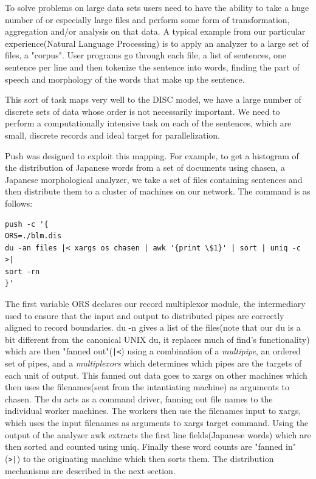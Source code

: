 \documentclass[10pt,conference,letterpaper]{IEEEtran}
\begin{document}
To solve problems on large data sets users need to have the ability to take a huge number of or especially large files and  perform some form of transformation, aggregation and/or analysis on that data.  A typical example from our particular experience(Natural Language Processing) is to apply an analyzer to a large set of files, a "corpus". User programs go through each file, a list of sentences, one sentence per line and then tokenize the sentence into words, finding the part of speech and morphology of the words that make up the sentence.

This sort of task maps very well to the DISC model, we have a large number of discrete sets of data whose order is not necessarily important. We need to perform a computationally intensive task on each of the sentences, which are small, discrete records and ideal target for parallelization. 

Push was designed to exploit this mapping. For example, to get a histogram of the distribution of Japanese words from a set of documents using chasen, a Japanese morphological analyzer, we take a set of files containing sentences and then distribute them to a cluster of machines on our network. The command is as follows:
\begin{verbatim}
push -c '{
ORS=./blm.dis
du -an files |< xargs os chasen | awk '{print \$1}' | sort | uniq -c >|
sort -rn
}'
\end{verbatim}

The first variable ORS declares our record multiplexor module, the intermediary used to ensure that the input and output to distributed pipes are correctly aligned to record boundaries. du -n gives a list of the files(note that our du is a bit different from the canonical UNIX du, it replaces much of find's functionality) which are then "fanned out"(\verb!|<!) using a combination of a \emph{multipipe}, an ordered set of pipes, and a \emph{multiplexors} which determines which pipes are the targets of each unit of output.  This fanned out data goes to xargs\cite{xargsman} on other machines which then uses the filenames(sent from the intantiating machine) as arguments to chasen. The du acts as a command driver, fanning out file names to the individual worker machines. The workers then use the filenames input to xargs, which uses the input filenames as arguments to xargs target command. Using the output of the analyzer awk extracts the first line fields(Japanese words) which are then sorted and counted using uniq.  Finally these word counts are "fanned in"(\verb!>|!) to the originating machine which then sorts them. The distribution mechanisms are described in the next section.
\end{document}
